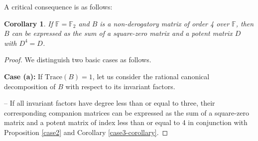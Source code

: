 \documentclass{amsart}
\def\FF{\mathbb{F}}
\newtheorem{corollary}[theorem]{Corollary}
\theoremstyle{definition}
\theoremstyle{remark}
\numberwithin{equation}{section}
\begin{document}
A critical consequence is as follows:

\begin{corollary}\label{case4-corollary}
If $\FF=\FF_2$ and $B$ is a non-derogatory matrix of order 4 over $\FF$, then $B$ can be expressed as the sum of a square-zero matrix and a potent matrix $D$ with $D^4=D$.
\end{corollary}

\begin{proof} We distinguish two basic cases as follows.

\medskip

{\bf Case (a):} If $\text{Trace}(B)=1$, let us consider the rational canonical decomposition of $B$ with respect to its invariant factors.

\medskip

\noindent -- If all invariant factors have degree less than or equal to three, their corresponding companion matrices can be expressed as the sum of a square-zero matrix and a potent matrix of index less than or equal to 4 in conjunction with Proposition \ref{case2} and Corollary \ref{case3-corollary}.

\medskip


\end{proof}
\end{document}
